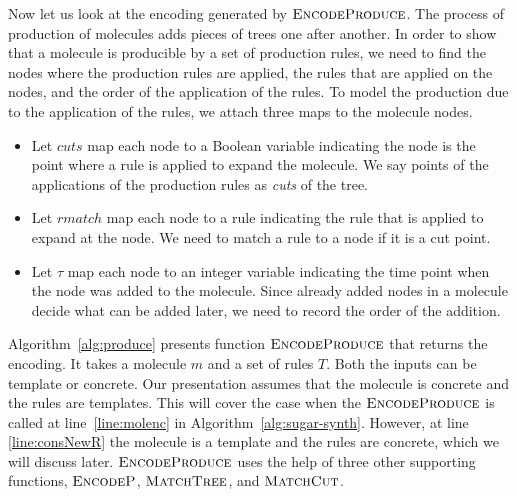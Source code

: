 Now let us look at the encoding generated by $\textsc{EncodeProduce}$.
The process of production of molecules adds pieces of trees
one after another.
In order to show that a molecule is producible by a set of production rules,
we need to find the nodes where the production rules are applied,
the rules that are applied on the nodes, and
the order of the application of the rules.
To model the production due to the application of the rules,
we attach three maps to the molecule nodes.
\begin{itemize}
\item Let $cuts$ map each node to a Boolean variable
indicating the node is the point where a rule is applied to
expand the molecule.
We say points of the applications of the production
rules as {\em cuts} of the tree.

\item Let $rmatch$ map each node to a rule indicating
  the rule that is applied to expand at the node.
  We need to match a rule to a node if it is a cut point.
\item Let $\tau$ map each node to an integer variable
  indicating the time point when the node was added to the molecule.
  Since already added nodes in a molecule decide what can be added later,
  we need to record the order of the addition.
\end{itemize}


Algorithm~\ref{alg:produce} presents function $\textsc{EncodeProduce}$
that returns the encoding.
It takes a molecule $m$ and a set of rules $T$.
Both the inputs can be template or concrete.
Our presentation assumes that the molecule is concrete and
the rules are templates.
This will cover the case when the $\textsc{EncodeProduce}$ is called at
line~\ref{line:molenc} in Algorithm~\ref{alg:sugar-synth}.
However, at line \ref{line:consNewR} the molecule is a template
and the rules are concrete, which we will discuss later.
$\textsc{EncodeProduce}$ uses the help of three other supporting functions,
$\textsc{EncodeP}$, $\textsc{MatchTree}$, and $\textsc{MatchCut}$.


